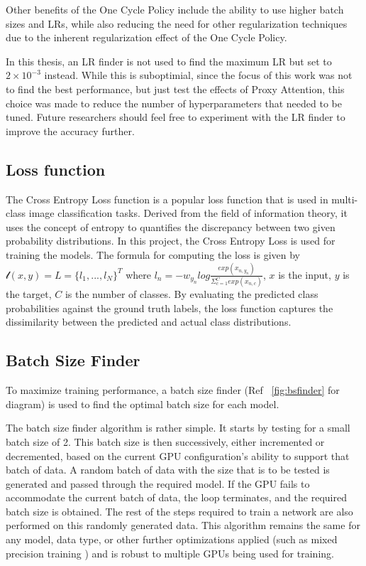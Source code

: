 \documentclass[a4paper,11pt,openright]{book}
\begin{document}
Other benefits of the One Cycle Policy include the ability to use higher batch sizes and LRs, while also reducing the need for other regularization techniques due to the inherent regularization effect of the One Cycle Policy.

In this thesis, an LR finder is not used to find the maximum LR but set to $2\times 10^{-3}$ instead. While this is suboptimial, since the focus of this work was not to find the best performance, but just test the effects of Proxy Attention, this choice was made to reduce the number of hyperparameters that needed to be tuned. Future researchers should feel free to experiment with the LR finder to improve the accuracy further.

\subsection{Loss function}
The Cross Entropy Loss function is a popular loss function that is used in multi-class image classification tasks. Derived from the field of information theory, it uses the concept of entropy to quantifies the discrepancy between two given probability distributions. In this project, the Cross Entropy Loss is used for training the models. The formula for computing the loss is given by $\mathscr{l}(x,y) = L = \{l_{1}, ..., l_{N}\}^{T}$ where $l_{n} = -w_{y_{n}}log \frac{exp(x_{n, y_{n}})}{\Sigma_{c=1}^{C}exp(x_{n,c})}$, $x$ is the input, $y$ is the target, $C$ is the number of classes. By evaluating the predicted class probabilities against the ground truth labels, the loss function captures the dissimilarity between the predicted and actual class distributions. 

\subsection{Batch Size Finder}
To maximize training performance, a batch size finder (Ref ~\ref{fig:bsfinder} for diagram) is used to find the optimal batch size for each model.

The batch size finder algorithm is rather simple. It starts by testing for a small batch size of 2. This batch size is then successively, either incremented or decremented, based on the current GPU configuration's ability to support that batch of data.
A random batch of data with the size that is to be tested is generated and passed through the required model. If the GPU fails to accommodate the current batch of data, the loop terminates, and the required batch size is obtained. The rest of the steps required to train a network are also performed on this randomly generated data.
This algorithm remains the same for any model, data type, or other further optimizations applied (such as mixed precision training \cite{micikeviciusMixedPrecisionTraining2017}) and is robust to multiple GPUs being used for training.
\end{document}
